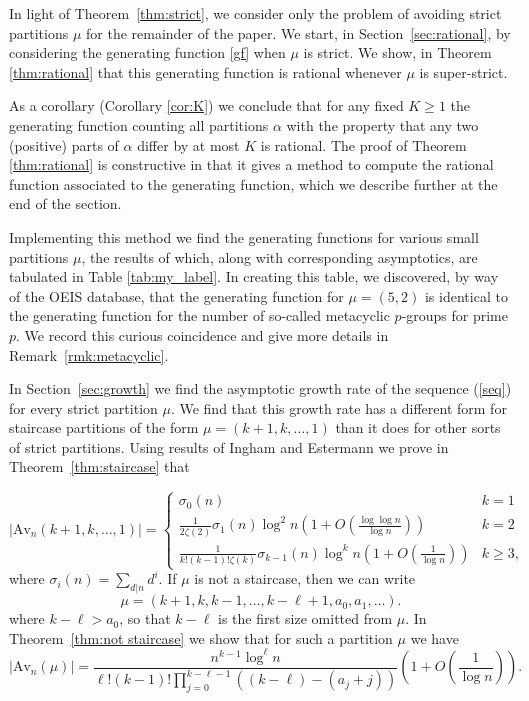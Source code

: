 \documentclass{article}
\theoremstyle{plain}
\theoremstyle{definition}
\newcommand{\Av}{\text{Av}}
\begin{document}
In light of Theorem~\ref{thm:strict}, we consider only the problem of avoiding strict partitions $\mu$ for the remainder of the paper. We start, in Section~\ref{sec:rational}, by considering the generating function \eqref{gf} when $\mu$ is strict.  We show, in Theorem \ref{thm:rational} that this generating function is rational whenever $\mu$ is super-strict.

As a corollary (Corollary \ref{cor:K}) we conclude that for any fixed $K\geq 1$ the generating function counting all partitions  $\alpha$ with the property that any two (positive) parts of $\alpha$ differ by at most $K$ is rational.  The proof of Theorem \ref{thm:rational} is constructive in that it gives a method to compute the rational function associated to the generating function, which we describe further at the end of the section.  

Implementing this method we find the generating functions for various small partitions $\mu$, the results of which, along with corresponding asymptotics, are tabulated in Table \ref{tab:my_label}.  In creating this table, we discovered, by way of the OEIS database, that the generating function for $\mu=(5,2)$ is identical to the generating function for the number of so-called metacyclic $p$-groups for prime $p$.  We record this curious coincidence and give more details in Remark~\ref{rmk:metacyclic}.  

In Section~\ref{sec:growth} we find the asymptotic growth rate of the sequence (\ref{seq}) for every strict partition $\mu$. We find that this growth rate has a different form for staircase partitions of the form $\mu=(k+1,k,\ldots, 1)$ than it does for other sorts of strict partitions. Using results of Ingham \cite{Ingham} and Estermann 
\cites{Estermann1,Estermann2} we prove in Theorem~\ref{thm:staircase} that

\begin{equation*}
|\Av_n(k+1,k,\ldots,1)| =\begin{cases}
\sigma_0(n) & k=1  \\
\frac{1}{2\zeta(2)}\sigma_{1}(n)\log^2 n\left(1+O\left(\frac{\log \log n}{\log n}\right)\right) & k=2 \\
\frac{1}{k!(k-1)!\zeta(k)}\sigma_{k-1}(n)\log^k n\left(1+O\left(\frac{1}{\log n}\right)\right) & k\geq 3,
\end{cases}
\end{equation*}
where $\sigma_i(n) = \sum_{d\vert n}d^i$.  If $\mu$ is not a staircase, then we can write 
$$\mu = (k+1,k, k-1,\ldots, k-\ell+1, a_0,a_1,\ldots). $$
where $k-\ell>a_0$, so that $k - \ell$ is the first size omitted from $\mu$.  In Theorem~\ref{thm:not staircase} we show that for such a partition $\mu$ we have
\begin{equation} |\Av_n(\mu)| 
= \frac{n^{k-1}\log^\ell n}{\ell!(k-1)!
\prod_{j=0}^{k-\ell-1}\left((k-\ell) -(a_j+j)\right)}
\left(1+O\left(\frac{1}{\log n}\right)\right). \label{eq:introgencase} \end{equation}
\end{document}
